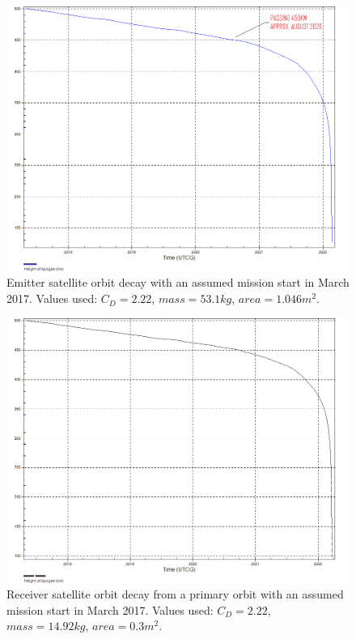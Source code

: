 \begin{landscape}
\begin{figure}[ht!]
\centering
\includegraphics[width = \textheight]{chapters/img/emitterDecay.png}
\caption{Emitter satellite orbit decay with an assumed mission start in March 2017. Values used: $C_D = 2.22$, $mass = 53.1 kg$, $area = 1.046 m^2$.}
\label{fig:emLife}
\end{figure}

\begin{figure}[ht!]
\centering
\includegraphics[width = \textheight]{chapters/img/receiverDecay.png}
\caption{Receiver satellite orbit decay from a primary orbit with an assumed mission start in March 2017. Values used: $C_D = 2.22$, $mass = 14.92 kg$, $area = 0.3 m^2$.}
\label{fig:recLife}
\end{figure}


\end{landscape}
